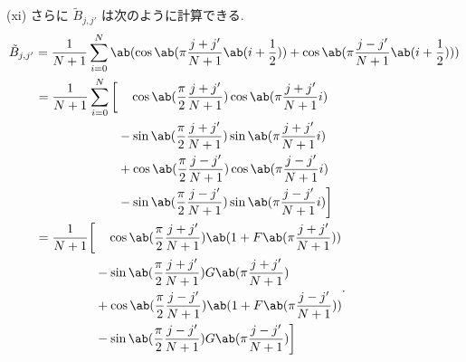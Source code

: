 \documentclass[uplatex,diffipdfmx,a4paper,11pt]{jlreq}
\theoremstyle{definition}
\begin{document}
(xi) さらに $\tilde{B}_{j,j'}$ は次のように計算できる.
\begin{align}
  \tilde{B}_{j,j'} & = \frac{1}{N+1}\sum_{i=0}^{N}\ab(\cos\ab(\pi\frac{j + j'}{N+1}\ab(i + \frac{1}{2})) + \cos\ab(\pi\frac{j - j'}{N+1}\ab(i + \frac{1}{2}))) \\
                   & \ \begin{aligned}
                         = \frac{1}{N+1}\sum_{i=0}^{N}\bigg[ & \quad\cos\ab(\frac{\pi}{2}\frac{j + j'}{N+1})\cos\ab(\pi\frac{j + j'}{N+1}i)    \\
                                                             & - \sin\ab(\frac{\pi}{2}\frac{j + j'}{N+1})\sin\ab(\pi\frac{j + j'}{N+1}i)       \\
                                                             & + \cos\ab(\frac{\pi}{2}\frac{j - j'}{N+1})\cos\ab(\pi\frac{j - j'}{N+1}i)       \\
                                                             & - \sin\ab(\frac{\pi}{2}\frac{j - j'}{N+1})\sin\ab(\pi\frac{j - j'}{N+1}i)\bigg]
                       \end{aligned}                                    \\
                   & \ \begin{aligned}
                         = \frac{1}{N+1}\bigg[ & \quad\cos\ab(\frac{\pi}{2}\frac{j + j'}{N+1})\ab(1 + F\ab(\pi\frac{j + j'}{N+1})) \\
                                               & - \sin\ab(\frac{\pi}{2}\frac{j + j'}{N+1})G\ab(\pi\frac{j + j'}{N+1})             \\
                                               & + \cos\ab(\frac{\pi}{2}\frac{j - j'}{N+1})\ab(1 + F\ab(\pi\frac{j - j'}{N+1}))    \\
                                               & - \sin\ab(\frac{\pi}{2}\frac{j - j'}{N+1})G\ab(\pi\frac{j - j'}{N+1})\bigg]
                       \end{aligned}.
\end{align}
\end{document}
